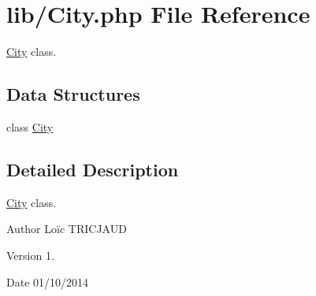 \hypertarget{_city_8php}{\section{lib/\-City.php File Reference}
\label{_city_8php}
}


\hyperlink{class_city}{City} class.  


\subsection*{Data Structures}
\begin{DoxyCompactItemize}
\item 
class \hyperlink{class_city}{City}
\end{DoxyCompactItemize}


\subsection{Detailed Description}
\hyperlink{class_city}{City} class. \begin{DoxyAuthor}{Author}
Loïc T\-R\-I\-C\-J\-A\-U\-D 
\end{DoxyAuthor}
\begin{DoxyVersion}{Version}
1. 
\end{DoxyVersion}
\begin{DoxyDate}{Date}
01/10/2014 
\end{DoxyDate}
